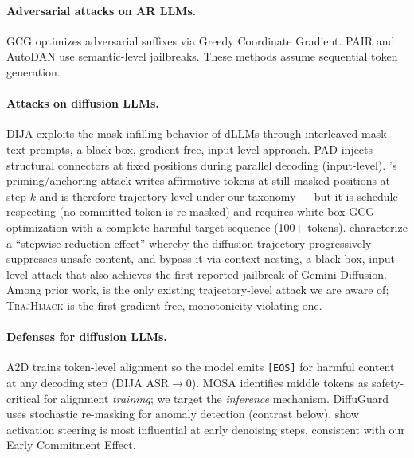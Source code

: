 \documentclass{article}
\theoremstyle{coloredthm}
\newcommand{\method}{\textsc{TrajHijack}}
\newcommand{\dllms}{dLLMs}
\begin{document}
\paragraph{Adversarial attacks on AR LLMs.} GCG \citep{zou2023gcg} optimizes adversarial suffixes via Greedy Coordinate Gradient. PAIR \citep{chao2025pair} and AutoDAN \citep{liu2024autodan} use semantic-level jailbreaks. These methods assume sequential token generation.

\paragraph{Attacks on diffusion LLMs.} DIJA \citep{wen2025dija} exploits the mask-infilling behavior of \dllms{} through interleaved mask-text prompts, a black-box, gradient-free, input-level approach. PAD \citep{zhang2025pad} injects structural connectors at fixed positions during parallel decoding (input-level). \citet{yamabe2026priming}'s priming/anchoring attack writes affirmative tokens at still-masked positions at step $k$ and is therefore trajectory-level under our taxonomy --- but it is schedule-respecting (no committed token is re-masked) and requires white-box GCG optimization with a complete harmful target sequence (100+ tokens). \citet{he2026fragileguardrail} characterize a ``stepwise reduction effect'' whereby the diffusion trajectory progressively suppresses unsafe content, and bypass it via context nesting, a black-box, input-level attack that also achieves the first reported jailbreak of Gemini Diffusion. Among prior work, \citeauthor{yamabe2026priming} is the only existing trajectory-level attack we are aware of; \method{} is the first gradient-free, monotonicity-violating one.

\paragraph{Defenses for diffusion LLMs.} A2D \citep{jeung2026a2d} trains token-level alignment so the model emits \texttt{[EOS]} for harmful content at any decoding step (DIJA ASR$\to\!0$). MOSA \citep{xie2026mosa} identifies middle tokens as safety-critical for alignment \emph{training}; we target the \emph{inference} mechanism. DiffuGuard \citep{li2025diffuguard} uses stochastic re-masking for anomaly detection (contrast below). \citet{shnaidman2025activationsteering} show activation steering is most influential at early denoising steps, consistent with our Early Commitment Effect.
\end{document}
